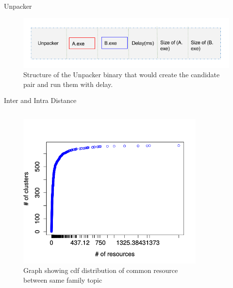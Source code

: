 \documentclass{beamer}
\begin{document}
\begin{frame}[plain]{Unpacker}
\begin{figure}[H]
  \centering
  \includegraphics[scale=0.5]{figures/unpacker.png}
\caption{Structure of the Unpacker binary that would create the candidate pair and run them with delay.}
\label{fig:unpacker}
\end{figure}
\end{frame}
\begin{frame}[plain]{Inter and Intra Distance}
\begin{columns}
  \begin{column}{5cm}
    \begin{figure}[H]
      \begin{center}
        \includegraphics[scale=0.3]{figures/intra_clustered_common.png}
      \end{center}
      \captionsetup{font=small}
      \caption{ Graph showing cdf distribution of common resource between same family topic}
    \end{figure}
  \end{column}
  \begin{column}{5cm}
    \begin{figure}[H]

\end{figure}
\end{column}
\end{columns}
\end{frame}
\end{document}
